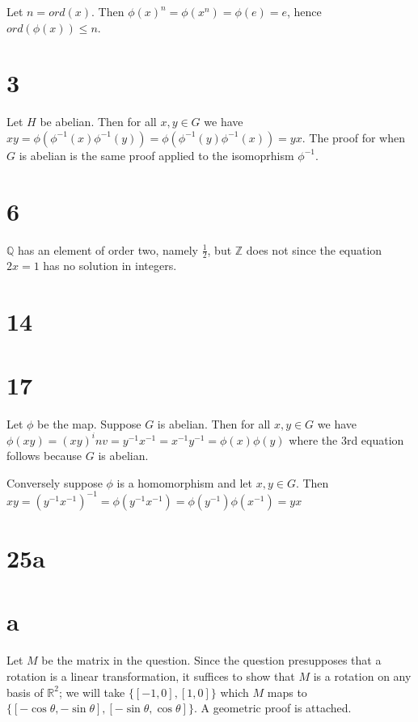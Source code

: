\documentclass{article}
\def\Z{\mathbb{Z}}
\def\R{\mathbb{R}}
\def\Q{\mathbb{Q}}
\def\inv{{-1}}
\begin{document}
Let $n = ord(x)$. Then $\phi(x)^n = \phi(x^n) = \phi(e) = e$, hence $ord(\phi(x)) \le n$.

\section*{3}

Let $H$ be abelian. Then for all $x, y \in G$ we have $xy = \phi(\phi^\inv(x) \phi^\inv(y)) = \phi(\phi^\inv(y) \phi^\inv(x)) = yx$. The proof for when $G$ is abelian is the same proof applied to the isomoprhism $\phi^\inv$.

\section*{6}

$\Q$ has an element of order two, namely $\frac{1}{2}$, but $\Z$ does not since the equation $2x = 1$ has no solution in integers.

\section*{14}

\section*{17}

Let $\phi$ be the map. Suppose $G$ is abelian. Then for all $x, y \in G$ we have $\phi(xy) = (xy)^inv = y^\inv x^\inv = x^\inv y^\inv = \phi(x) \phi(y)$ where the 3rd equation follows because $G$ is abelian.

Conversely suppose $\phi$ is a homomorphism and let $x, y \in G$. Then $xy = (y^\inv x^\inv)^\inv = \phi(y^\inv x^\inv) = \phi(y^\inv) \phi(x^\inv) = yx$

\section*{25a}

\section*{a}

Let $M$ be the matrix in the question. Since the question presupposes that a rotation is a linear transformation, it suffices to show that $M$ is a rotation on any basis of $\R^2$; we will take $\{[-1, 0], [1, 0]\}$ which $M$ maps to $\{[-\cos\theta, -\sin\theta], [-\sin\theta, \cos\theta]\}$. A geometric proof is attached.
\end{document}
